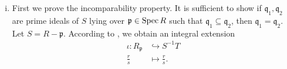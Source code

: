\begin{prf}
    \begin{enumerate}[(i)]
        \item First we prove the incomparability property. It is sufficient to show if $\mathfrak{q}_1, \mathfrak{q}_2$ are prime ideals of $S$ lying over $\mathfrak{p}\in \operatorname{Spec} R$ such that $\mathfrak{q}_1\subseteq \mathfrak{q}_2$, then $\mathfrak{q}_1=\mathfrak{q}_2$. Let $S=R-\mathfrak{p}$. According to , we obtain an integral extension
        \begin{align*}
            \iota: R_\mathfrak{p}&\hookrightarrow S^{-1}T\\
            \frac{r}{s}&\longmapsto \frac{r}{s}.
        \end{align*}
        

\end{enumerate}
\end{prf}

